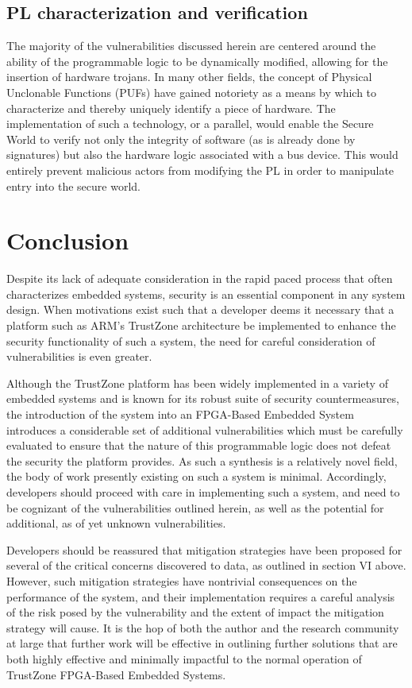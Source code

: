 \documentclass[journal]{IEEEtran}
\begin{document}
\subsection{PL characterization and verification}
The majority of the vulnerabilities discussed herein are centered around the ability of
the programmable logic to be dynamically modified, allowing for the insertion of hardware
trojans. In many other fields, the concept of Physical Unclonable Functions (PUFs) have
gained notoriety as a means by which to characterize and thereby uniquely identify a piece
of hardware. The implementation of such a technology, or a parallel, would enable
the Secure World to verify not only the integrity of software (as is already done by
signatures) but also the hardware logic associated with a bus device. This would entirely
prevent malicious actors from modifying the PL in order to manipulate entry into the
secure world.

\section{Conclusion}
Despite its lack of adequate consideration in the rapid paced process that often 
characterizes embedded systems, security is an essential component in any system design.
When motivations exist such that a developer deems it necessary that a platform such as
ARM's TrustZone architecture be implemented to enhance the security functionality of such
a system, the need for careful consideration of vulnerabilities is even greater.

Although the TrustZone platform has been widely implemented in a variety of embedded
systems and is known for its robust suite of security countermeasures, the introduction of
the system into an FPGA-Based Embedded System introduces a considerable set of additional
vulnerabilities which must be carefully evaluated to ensure that the nature of this
programmable logic does not defeat the security the platform provides. As such a synthesis
is a relatively novel field, the body of work presently existing on such a system is
minimal. Accordingly, developers should proceed with care in implementing such a system,
and need to be cognizant of the vulnerabilities outlined herein, as well as the potential
for additional, as of yet unknown vulnerabilities.

Developers should be reassured that mitigation strategies have been proposed for several
of the critical concerns discovered to data, as outlined in section VI above. However,
such mitigation strategies have nontrivial consequences on the performance of the system,
and their implementation requires a careful analysis of the risk posed by the
vulnerability and the extent of impact the mitigation strategy will cause. It is the hop
of both the author and the research community at large that further work will be effective
in outlining further solutions that are both highly effective and minimally impactful to
the normal operation of TrustZone FPGA-Based Embedded Systems.
\end{document}
